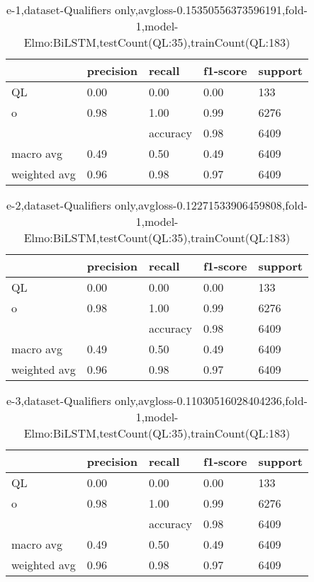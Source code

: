 \begin{table}[!ht] 
\centering
\caption{e-1,dataset-Qualifiers only,avgloss-0.15350556373596191,fold-1,model-Elmo:BiLSTM,testCount(QL:35),trainCount(QL:183)}\label{e-1data-qualS.tsv}
\begin{tabularx}{300pt}{|X|X|X|X|X|}
\hline
&precision&recall&f1-score&support\\
\hline
QL&0.00&0.00&0.00&133\\
\hline
o&0.98&1.00&0.99&6276\\
\hline
&&accuracy&0.98&6409\\
\hline
macro avg&0.49&0.50&0.49&6409\\
\hline
weighted avg&0.96&0.98&0.97&6409\\
\hline
\end{tabularx}
\end{table}
\begin{table}[!ht] 
\centering
\caption{e-2,dataset-Qualifiers only,avgloss-0.12271533906459808,fold-1,model-Elmo:BiLSTM,testCount(QL:35),trainCount(QL:183)}\label{e-2data-qualS.tsv}
\begin{tabularx}{300pt}{|X|X|X|X|X|}
\hline
&precision&recall&f1-score&support\\
\hline
QL&0.00&0.00&0.00&133\\
\hline
o&0.98&1.00&0.99&6276\\
\hline
&&accuracy&0.98&6409\\
\hline
macro avg&0.49&0.50&0.49&6409\\
\hline
weighted avg&0.96&0.98&0.97&6409\\
\hline
\end{tabularx}
\end{table}
\begin{table}[!ht] 
\centering
\caption{e-3,dataset-Qualifiers only,avgloss-0.11030516028404236,fold-1,model-Elmo:BiLSTM,testCount(QL:35),trainCount(QL:183)}\label{e-3data-qualS.tsv}
\begin{tabularx}{300pt}{|X|X|X|X|X|}
\hline
&precision&recall&f1-score&support\\
\hline
QL&0.00&0.00&0.00&133\\
\hline
o&0.98&1.00&0.99&6276\\
\hline
&&accuracy&0.98&6409\\
\hline
macro avg&0.49&0.50&0.49&6409\\
\hline
weighted avg&0.96&0.98&0.97&6409\\
\hline
\end{tabularx}
\end{table}
